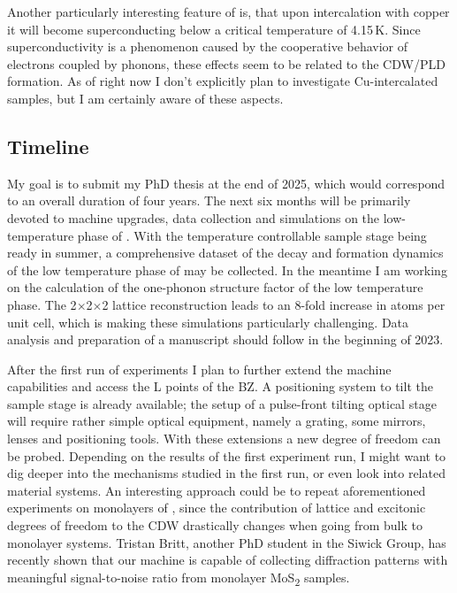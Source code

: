 Another particularly interesting feature of \ts\space is, that upon intercalation with copper it will become superconducting below a critical temperature of 4.15\,K\cite{morosan2006}.
Since superconductivity is a phenomenon caused by the cooperative behavior of electrons coupled by phonons, these effects seem to be related to the \ac{CDW}/\ac{PLD} formation.
As of right now I don't explicitly plan to investigate Cu-intercalated samples, but I am certainly aware of these aspects.

\subsection*{Timeline}
My goal is to submit my PhD thesis at the end of 2025, which would correspond to an overall duration of four years.
The next six months will be primarily devoted to machine upgrades, data collection and simulations on the low-temperature phase of \ts.
With the temperature controllable sample stage being ready in summer, a comprehensive dataset of the decay and formation dynamics of the low temperature phase of \ts\space may be collected.
In the meantime I am working on the calculation of the one-phonon structure factor of the low temperature phase.
The 2$\times$2$\times$2 lattice reconstruction leads to an 8-fold increase in atoms per unit cell, which is making these simulations particularly challenging.
Data analysis and preparation of a manuscript should follow in the beginning of 2023.

After the first run of experiments I plan to further extend the machine capabilities and access the L points of the \ac{BZ}.
A positioning system to tilt the sample stage is already available; the setup of a pulse-front tilting optical stage will require rather simple optical equipment, namely a grating, some mirrors, lenses and positioning tools.
With these extensions a new degree of freedom can be probed.
Depending on the results of the first experiment run, I might want to dig deeper into the mechanisms studied in the first run, or even look into related material systems.
An interesting approach could be to repeat aforementioned experiments on monolayers of \ts, since the contribution of lattice and excitonic degrees of freedom to the \ac{CDW} drastically changes when going from bulk to monolayer systems.
Tristan Britt, another PhD student in the Siwick Group, has recently shown that our machine is capable of collecting diffraction patterns with meaningful signal-to-noise ratio from monolayer MoS\textsubscript{2} samples.